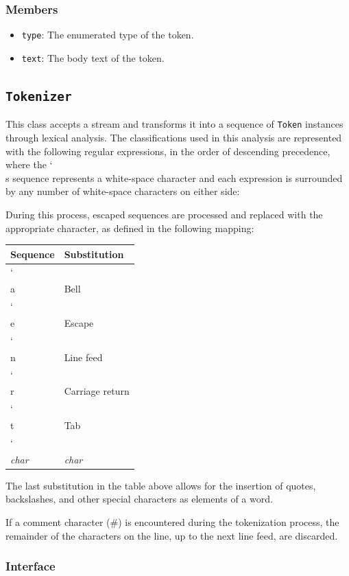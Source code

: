 \documentclass{article}
\newcommand{\bslash}{\char`\\}
\begin{document}
  \subsubsection{Members}
  \begin{itemize}
    \item \texttt{type}: The enumerated type of the token.
    \item \texttt{text}: The body text of the token.
  \end{itemize}

  \subsection{\texttt{Tokenizer}}

  This class accepts a stream and transforms it into a sequence of
  \texttt{Token} instances through lexical analysis.  The
  classifications used in this analysis are represented with the
  following regular expressions, in the order of descending precedence,
  where the \bslash s sequence represents a white-space character and
  each expression is surrounded by any number of white-space characters
  on either side:

  

  During this process, escaped sequences are processed and replaced with
  the appropriate character, as defined in the following mapping:

  \begin{tabular}{l|l}
    Sequence & Substitution \\
    \hline
    \bslash a & Bell \\
    \bslash e & Escape \\
    \bslash n & Line feed \\
    \bslash r & Carriage return \\
    \bslash t & Tab \\
    \bslash \emph{char} & \emph{char}
  \end{tabular}

  The last substitution in the table above allows for the insertion of
  quotes, backslashes, and other special characters as elements of a
  word.

  If a comment character (\#) is encountered during the tokenization
  process, the remainder of the characters on the line, up to the next
  line feed, are discarded.

  \subsubsection{Interface}
  
\end{document}
